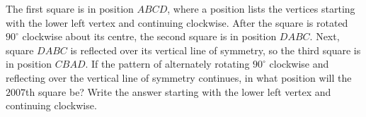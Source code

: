 The first square is in position $ABCD$, where a position lists the vertices starting with the lower left vertex and continuing clockwise. After the square is rotated $90^\circ$ clockwise about its centre, the second square is in position $DABC$. Next, square $DABC$ is reflected over its vertical line of symmetry, so the third square is in position $CBAD$. If the pattern of alternately rotating $90^\circ$ clockwise and reflecting over the vertical line of symmetry continues, in what position will the $2007$th square be? Write the answer starting with the lower left vertex and continuing clockwise.

